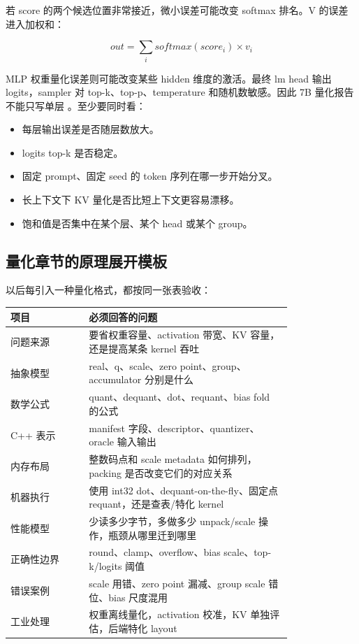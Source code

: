 若 score 的两个候选位置非常接近，微小误差可能改变 softmax 排名。V 的误差进入加权和：

\[
out = \sum_i softmax(score_i) \times v_i
\]

MLP 权重量化误差则可能改变某些 hidden 维度的激活。最终 lm head 输出 logits，sampler 对 top-k、top-p、temperature 和随机数敏感。因此 7B 量化报告不能只写单层 。至少要同时看：

\begin{itemize}
  \item 每层输出误差是否随层数放大。
  \item logits top-k 是否稳定。
  \item 固定 prompt、固定 seed 的 token 序列在哪一步开始分叉。
  \item 长上下文下 KV 量化是否比短上下文更容易漂移。
  \item 饱和值是否集中在某个层、某个 head 或某个 group。
\end{itemize}

\subsection{量化章节的原理展开模板}

以后每引入一种量化格式，都按同一张表验收：

\begin{center}
\begin{tabular}{p{0.22\linewidth}p{0.58\linewidth}}
\toprule
项目 & 必须回答的问题 \\
\midrule
问题来源 & 要省权重容量、activation 带宽、KV 容量，还是提高某条 kernel 吞吐 \\
抽象模型 & real、q、scale、zero point、group、accumulator 分别是什么 \\
数学公式 & quant、dequant、dot、requant、bias fold 的公式 \\
C++ 表示 & manifest 字段、descriptor、quantizer、oracle 输入输出 \\
内存布局 & 整数码点和 scale metadata 如何排列，packing 是否改变它们的对应关系 \\
机器执行 & 使用 int32 dot、dequant-on-the-fly、固定点 requant，还是查表/特化 kernel \\
性能模型 & 少读多少字节，多做多少 unpack/scale 操作，瓶颈从哪里迁到哪里 \\
正确性边界 & round、clamp、overflow、bias scale、top-k/logits 阈值 \\
错误案例 & scale 用错、zero point 漏减、group scale 错位、bias 尺度混用 \\
工业处理 & 权重离线量化，activation 校准，KV 单独评估，后端特化 layout \\
\bottomrule
\end{tabular}
\end{center}


